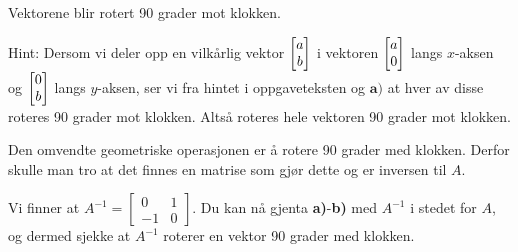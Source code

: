 \begin{losning}

\begin{punkt}

Vektorene blir rotert 90 grader mot klokken.

\begin{center}
\end{center}


\end{punkt}

\begin{punkt}
Hint: Dersom vi deler opp en vilkårlig vektor $\begin{bmatrix} a \\ b \end{bmatrix}$ i vektoren $\begin{bmatrix} a \\ 0 \end{bmatrix}$ langs $x$-aksen og $\begin{bmatrix} 0 \\ b \end{bmatrix}$ langs $y$-aksen, ser vi fra hintet i oppgaveteksten og $\textbf{a)}$ at hver av disse roteres 90 grader mot klokken. Altså roteres hele vektoren 90 grader mot klokken.
\end{punkt}


\begin{punkt}
Den omvendte geometriske operasjonen er å rotere 90 grader med klokken. Derfor skulle man tro at det finnes en matrise som gjør dette og er inversen til $A$.
\end{punkt}


\begin{punkt}
Vi finner at $A^{-1}=\begin{bmatrix}
0 & 1\\
-1 & 0
\end{bmatrix}.$ Du kan nå gjenta \textbf{a)}-\textbf{b)} med $A^{-1}$ i stedet for $A$, og dermed sjekke at $A^{-1}$ roterer en vektor 90 grader med klokken.
\end{punkt}

\end{losning}



